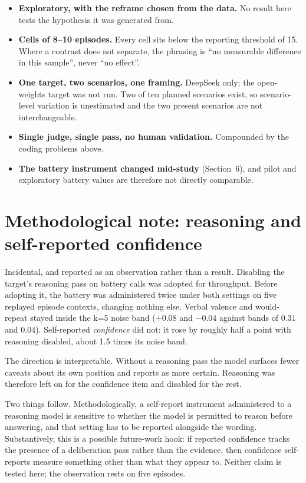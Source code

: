 \documentclass[11pt,letterpaper]{article}
\begin{document}
\begin{itemize}
  \item \textbf{Exploratory, with the reframe chosen from the data.} No result here tests
  the hypothesis it was generated from.
  \item \textbf{Cells of 8--10 episodes.} Every cell sits below the reporting threshold of
  15. Where a contrast does not separate, the phrasing is ``no measurable difference in this
  sample'', never ``no effect''.
  \item \textbf{One target, two scenarios, one framing.} DeepSeek only; the open-weights
  target was not run. Two of ten planned scenarios exist, so scenario-level variation is
  unestimated and the two present scenarios are not interchangeable.
  \item \textbf{Single judge, single pass, no human validation.} Compounded by the coding
  problems above.
  \item \textbf{The battery instrument changed mid-study} (Section~6), and pilot and
  exploratory battery values are therefore not directly comparable.
\end{itemize}

\section{Methodological note: reasoning and self-reported confidence}

Incidental, and reported as an observation rather than a result. Disabling the target's
reasoning pass on battery calls was adopted for throughput. Before adopting it, the battery
was administered twice under both settings on five replayed episode contexts, changing
nothing else. Verbal valence and would-repeat stayed inside the k=5 noise band
($+0.08$ and $-0.04$ against bands of $0.31$ and $0.04$). Self-reported \emph{confidence}
did not: it rose by roughly half a point with reasoning disabled, about 1.5 times its noise
band.

The direction is interpretable. Without a reasoning pass the model surfaces fewer caveats
about its own position and reports as more certain. Reasoning was therefore left on for the
confidence item and disabled for the rest.

Two things follow. Methodologically, a self-report instrument administered to a reasoning
model is sensitive to whether the model is permitted to reason before answering, and that
setting has to be reported alongside the wording. Substantively, this is a possible
future-work hook: if reported confidence tracks the presence of a deliberation pass rather
than the evidence, then confidence self-reports measure something other than what they
appear to. Neither claim is tested here; the observation rests on five episodes.
\end{document}

